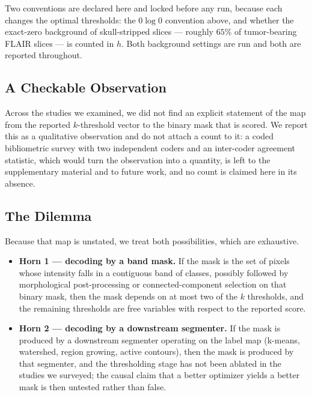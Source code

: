 Two conventions are declared here and locked before any run, because each changes
the optimal thresholds: the $0\log 0$ convention above, and whether the
exact-zero background of skull-stripped slices --- roughly $65\%$ of tumor-bearing
FLAIR slices --- is counted in $h$. Both background settings are run and both are
reported throughout.


\subsection{A Checkable Observation}

Across the studies we examined, we did not find an explicit statement of the map
from the reported $k$-threshold vector to the binary mask that is scored. We
report this as a qualitative observation and do not attach a count to it: a
coded bibliometric survey with two independent coders and an inter-coder
agreement statistic, which would turn the observation into a quantity, is left to
the supplementary material and to future work, and no count is claimed here in
its absence.

\subsection{The Dilemma}

Because that map is unstated, we treat both possibilities, which are exhaustive.

\begin{itemize}
  \item \textbf{Horn 1 --- decoding by a band mask.} If the mask is the set of
  pixels whose intensity falls in a contiguous band of classes, possibly followed
  by morphological post-processing or connected-component selection on that
  binary mask, then the mask depends on at most two of the $k$ thresholds, and
  the remaining thresholds are free variables with respect to the reported score.

  \item \textbf{Horn 2 --- decoding by a downstream segmenter.} If the mask is
  produced by a downstream segmenter operating on the label map (k-means,
  watershed, region growing, active contours), then the mask is produced by that
  segmenter, and the thresholding stage has not been ablated in the studies we
  surveyed; the causal claim that a better optimizer yields a better mask is
  then untested rather than false.
\end{itemize}

